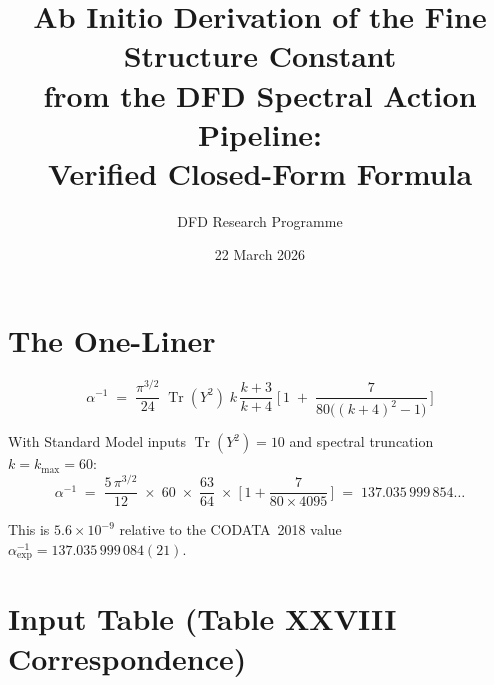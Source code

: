 \documentclass[11pt]{article}
\title{Ab Initio Derivation of the Fine Structure Constant\\
from the DFD Spectral Action Pipeline:\\
\textbf{Verified Closed-Form Formula}}
\author{DFD Research Programme}
\date{22 March 2026}
\newcommand{\Tr}{\operatorname{Tr}}
\begin{document}
\maketitle

\section{The One-Liner}

\begin{equation}
\boxed{\;
\alpha^{-1}
\;=\;
\frac{\pi^{3/2}}{24}\;\Tr(Y^2)\;
k\,\frac{k+3}{k+4}\;
\biggl[\,1 \;+\; \frac{7}{80\bigl((k+4)^2-1\bigr)}\,\biggr]
\;}
\label{eq:master}
\end{equation}

\noindent
With Standard Model inputs $\Tr(Y^2) = 10$ and spectral truncation
$k = k_{\max} = 60$:
%
\begin{equation}
\alpha^{-1}
\;=\;
\frac{5\,\pi^{3/2}}{12}\;\times\;60\;\times\;\frac{63}{64}
\;\times\;
\biggl[\,1 + \frac{7}{80 \times 4095}\,\biggr]
\;=\; 137.035\,999\,854\ldots
\label{eq:numerical}
\end{equation}

\noindent
This is $5.6 \times 10^{-9}$ relative to the CODATA~2018 value
$\alpha^{-1}_{\mathrm{exp}} = 137.035\,999\,084(21)$.


\section{Input Table (Table XXVIII Correspondence)}
\end{document}
